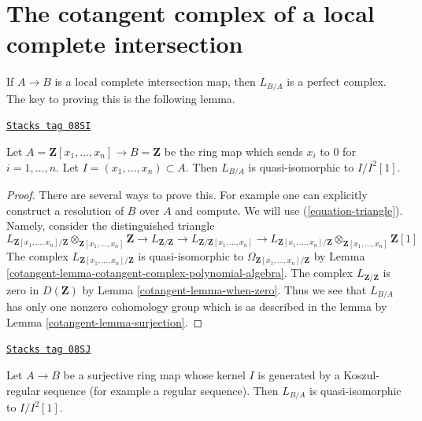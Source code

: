\section{The cotangent complex of a local complete intersection}
\label{cotangent-section-lci}
If $A \to B$ is a local complete intersection map, then
$L_{B/A}$ is a perfect complex. The key to proving this is
the following lemma.

\begin{lemma}
\label{cotangent-lemma-special-case}
\href{https://stacks.math.columbia.edu/tag/08SI}{\texttt{Stacks tag 08SI}}

Let $A = \mathbf{Z}[x_1, \ldots, x_n] \to B = \mathbf{Z}$
be the ring map which sends $x_i$ to $0$ for $i = 1, \ldots, n$.
Let $I = (x_1, \ldots, x_n) \subset A$. Then $L_{B/A}$ is quasi-isomorphic to
$I/I^2[1]$.
\end{lemma}

\begin{proof}

There are several ways to prove this. For example one can explicitly construct
a resolution of $B$ over $A$ and compute. We will use (\ref{equation-triangle}).
Namely, consider the distinguished triangle
$$
L_{\mathbf{Z}[x_1, \ldots, x_n]/\mathbf{Z}}
\otimes_{\mathbf{Z}[x_1, \ldots, x_n]} \mathbf{Z} \to
L_{\mathbf{Z}/\mathbf{Z}} \to
L_{\mathbf{Z}/\mathbf{Z}[x_1, \ldots, x_n]}\to
L_{\mathbf{Z}[x_1, \ldots, x_n]/\mathbf{Z}}
\otimes_{\mathbf{Z}[x_1, \ldots, x_n]} \mathbf{Z}[1]
$$
The complex $L_{\mathbf{Z}[x_1, \ldots, x_n]/\mathbf{Z}}$
is quasi-isomorphic to $\Omega_{\mathbf{Z}[x_1, \ldots, x_n]/\mathbf{Z}}$ by
Lemma \ref{cotangent-lemma-cotangent-complex-polynomial-algebra}.
The complex $L_{\mathbf{Z}/\mathbf{Z}}$ is zero in $D(\mathbf{Z})$ by
Lemma \ref{cotangent-lemma-when-zero}.
Thus we see that $L_{B/A}$ has only one nonzero cohomology group
which is as described in the lemma by Lemma \ref{cotangent-lemma-surjection}.
\end{proof}

\begin{lemma}
\label{cotangent-lemma-mod-regular-sequence}
\href{https://stacks.math.columbia.edu/tag/08SJ}{\texttt{Stacks tag 08SJ}}

Let $A \to B$ be a surjective ring map whose kernel $I$ is generated
by a Koszul-regular sequence (for example a regular sequence).
Then $L_{B/A}$ is quasi-isomorphic to $I/I^2[1]$.
\end{lemma}

